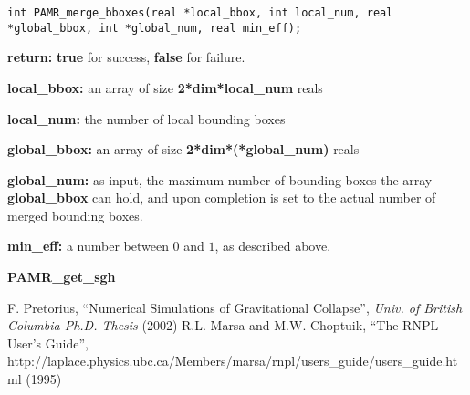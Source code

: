 \documentclass[aps,amssymb,unsortedaddress,nofootinbib]{revtex4}
\def\lsep{\itemsep 0.05in}
\begin{document}
\begin{verbatim}
int PAMR_merge_bboxes(real *local_bbox, int local_num, real *global_bbox, int *global_num, real min_eff);
\end{verbatim}
\begin{list}{}{\lsep}
\item {\bf return:} {\bf true} for success, {\bf false} for failure.
\item {\bf *local\_bbox:} an array of size {\bf 2*dim*local\_num} reals
\item {\bf local\_num:} the number of local bounding boxes
\item {\bf *global\_bbox:} an array of size {\bf 2*dim*(*global\_num)} reals
\item {\bf *global\_num:} as input, the maximum number of bounding boxes the array {\bf global\_bbox}
                          can hold, and upon completion is set to the actual number of 
                          merged bounding boxes.
\item {\bf min\_eff:} a number between $0$ and $1$, as described above.
\end{list}

{\bf PAMR\_get\_sgh}

\begin{thebibliography}{1}
 F. Pretorius,
 ``Numerical Simulations of Gravitational Collapse'',
 {\em Univ. of British Columbia Ph.D. Thesis} (2002)
 R.L. Marsa and M.W. Choptuik,
 ``The RNPL User's Guide'',
 {http://laplace.physics.ubc.ca/Members/marsa/rnpl/users\_guide/users\_guide.html}
 (1995)
\end{thebibliography}
\end{document}
